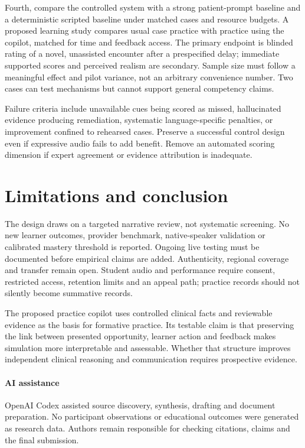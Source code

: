 \documentclass[pmlr,twocolumn,10pt]{jmlr}
\begin{document}
Fourth, compare the controlled system with a strong patient-prompt baseline and a deterministic scripted baseline under matched cases and resource budgets. A proposed learning study compares usual case practice with practice using the copilot, matched for time and feedback access. The primary endpoint is blinded rating of a novel, unassisted encounter after a prespecified delay; immediate supported scores and perceived realism are secondary. Sample size must follow a meaningful effect and pilot variance, not an arbitrary convenience number. Two cases can test mechanisms but cannot support general competency claims.

Failure criteria include unavailable cues being scored as missed, hallucinated evidence producing remediation, systematic language-specific penalties, or improvement confined to rehearsed cases. Preserve a successful control design even if expressive audio fails to add benefit. Remove an automated scoring dimension if expert agreement or evidence attribution is inadequate.

\section{Limitations and conclusion}
The design draws on a targeted narrative review, not systematic screening. No new learner outcomes, provider benchmark, native-speaker validation or calibrated mastery threshold is reported. Ongoing live testing must be documented before empirical claims are added. Authenticity, regional coverage and transfer remain open. Student audio and performance require consent, restricted access, retention limits and an appeal path; practice records should not silently become summative records.

The proposed practice copilot uses controlled clinical facts and reviewable evidence as the basis for formative practice. Its testable claim is that preserving the link between presented opportunity, learner action and feedback makes simulation more interpretable and assessable. Whether that structure improves independent clinical reasoning and communication requires prospective evidence.

\paragraph*{AI assistance}
OpenAI Codex assisted source discovery, synthesis, drafting and document preparation. No participant observations or educational outcomes were generated as research data. Authors remain responsible for checking citations, claims and the final submission.

\end{document}
